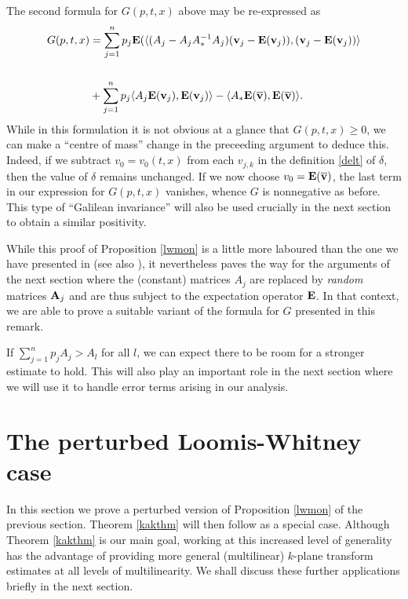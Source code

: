 \begin{remark}
The second formula for $G(p,t,x)$ above may be re-expressed as
\begin{eqnarray*}
\begin{aligned}
G(p,t,x) &= \sum_{j=1}^{n}
p_{j}{\hbox{\bf E}}(\langle(A_{j}-A_{j}A_{*}^{-1}A_{j})({\hbox{\bf v}}_{j}-{\hbox{\bf E}}({\hbox{\bf v}}_{j})),
({\hbox{\bf v}}_{j}-{\hbox{\bf E}}({\hbox{\bf v}}_{j}))\rangle\\
\\&+ \sum_{j=1}^{n}p_{j}\langle A_{j}{\hbox{\bf E}}({\hbox{\bf v}}_{j}),
{\hbox{\bf E}}({\hbox{\bf v}}_{j})\rangle - \langle A_* {\hbox{\bf E}}(\overline{{\hbox{\bf v}}}),{\hbox{\bf E}}(\overline{{\hbox{\bf v}}})\rangle.
\end{aligned}
\end{eqnarray*}
While in this formulation it is not obvious at a glance that $G(p,t,x) \geq 0$,
we can make a ``centre of mass'' change in the preceeding argument to deduce
this. Indeed, if we subtract $v_0 = v_0(t,x)$ from each $v_{j,k}$ in the
definition \eqref{delt} of $\delta$, then the value of $\delta$ remains
unchanged. If we now choose $v_0 = {\hbox{\bf E}}(\overline{{\hbox{\bf v}}})$, the last
term in our expression for $G(p,t,x)$ vanishes, whence $G$ is
nonnegative as before.  This type of ``Galilean invariance'' will also be used crucially
in the next section to obtain a similar positivity.

While this proof of Proposition \ref{lwmon} is a little more laboured than the one we have presented
in \cite{BCCT} (see also \cite{CLL}), it nevertheless paves the way for the
arguments of the next section where the (constant) matrices $A_j$ are replaced
by \emph{random} matrices ${\hbox{\bf A}}_j$ and are thus subject to the expectation
operator ${\hbox{\bf E}}$. In that context, we are able to prove a suitable variant of the
formula for $G$ presented in this remark.
\end{remark}

\begin{remark} If $\sum_{j=1}^n p_j A_j > A_l$ for all $l$, we can expect
there to be room for a stronger estimate to hold. This will also play an
important role in the next section where we will use it to handle error terms
arising in our analysis.
\end{remark}



\section{The perturbed Loomis-Whitney case}

In this section we prove a perturbed version of Proposition
\ref{lwmon} of the previous section. Theorem \ref{kakthm} will
then follow as a special case. Although Theorem \ref{kakthm} is
our main goal, working at this increased level of generality has
the advantage of providing more general (multilinear) $k$-plane
transform estimates at all levels of multilinearity. We shall
discuss these further applications briefly in the next section.

